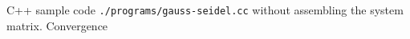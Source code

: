 
\begin{SolutionSheet}[\ref{sheet7}]

  \begin{Solution}
  \end{Solution}

  \begin{Solution}
  \end{Solution}

  \begin{Solution}
  \end{Solution}

  \begin{Solution}[Programming]
    C++ sample code \lstinline{./programs/gauss-seidel.cc} without
    assembling the system matrix. Convergence 
  \end{Solution}

\end{SolutionSheet}


